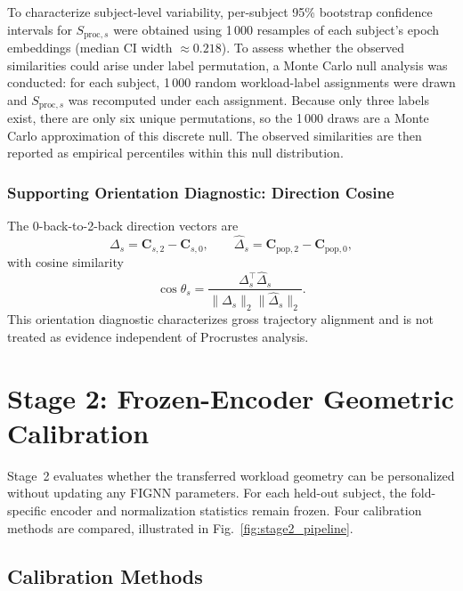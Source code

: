 \documentclass{ieeeaccess}
\begin{document}
To characterize subject-level variability, per-subject 95\% bootstrap
confidence intervals for $S_{\mathrm{proc},s}$ were obtained using 1\,000
resamples of each subject's epoch embeddings (median CI width $\approx0.218$).
To assess whether the observed similarities could arise under label permutation,
a Monte Carlo null analysis was conducted: for each subject, 1\,000 random
workload-label assignments were drawn and $S_{\mathrm{proc},s}$ was recomputed
under each assignment. Because only three labels exist, there are only six
unique permutations, so the 1\,000 draws are a Monte Carlo approximation of
this discrete null. The observed similarities are then reported as empirical
percentiles within this null distribution.

\subsubsection{Supporting Orientation Diagnostic: Direction Cosine}
The 0-back-to-2-back direction vectors are
\begin{equation}
  \Delta_s = \mathbf{C}_{s,2} - \mathbf{C}_{s,0}, \qquad
  \widehat{\Delta}_s = \mathbf{C}_{\mathrm{pop},2} - \mathbf{C}_{\mathrm{pop},0},
\end{equation}
with cosine similarity
\begin{equation}
  \cos\theta_s
  = \frac{\Delta_s^{\top}\widehat{\Delta}_s}
         {\|\Delta_s\|_2 \|\widehat{\Delta}_s\|_2}.
\end{equation}
This orientation diagnostic characterizes gross trajectory alignment and is
not treated as evidence independent of Procrustes analysis.

\section{Stage 2: Frozen-Encoder Geometric Calibration}
\label{sec:stage2}

Stage~2 evaluates whether the transferred workload geometry can be
personalized without updating any FIGNN parameters. For each held-out
subject, the fold-specific encoder and normalization statistics remain frozen.
Four calibration methods are compared, illustrated in
Fig.~\ref{fig:stage2_pipeline}.

\subsection{Calibration Methods}
\end{document}
